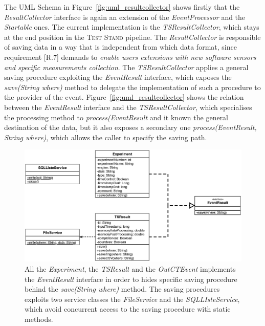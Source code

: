 The UML Schema in Figure~\ref{fig:uml_resultcollector} shows firstly that the \textit{ResultCollector} interface is again an extension of the \textit{EventProcessor} and the \textit{Startable} ones. The current implementation is the \textit{TSResultCollector}, which stays at the end position in the \textsc{Test Stand} pipeline. The \textit{ResultCollector} is responsible of saving data in a way that is independent from which data format, since requirement [R.7] demands to \textit{enable users extensions with new software sensors and specific measurements collection}. The \textit{TSResultCollector} applies a general saving procedure exploiting the \textit{EventResult} interface, which exposes the \textit{save(String where)} method to delegate the implementation of such a procedure to the provider of the event. Figure~\ref{fig:uml_resultcollector} shows the relation between the \textit{EventResult} interface and the \textit{TSResultCollector}, which specialises the processing method to \textit{process(EventResult} and it known the general destination of the data, but it also exposes a secondary one \textit{process(EventResult, String where)}, which allows the caller to specify the saving path.


\begin{figure}[tbh]
  \centering
	\includegraphics[width=\linewidth]{images/uml_resultcollector_events}
	\caption[\textsc{ResultCollector} Events - UML Schema]{ All the \textit{Experiment}, the \textit{TSResult} and the \textit{OutCTEvent} implements the \textit{EventResult} interface in order to hides specific saving procedure behind the \textit{save(String where)} method. The saving procedures exploits two service classes the \textit{FileService} and the \textit{SQLLIsteService}, which avoid concurrent access to the saving procedure with static methods.} 
  	\label{fig:uml_resultcollector_events}
\end{figure}

